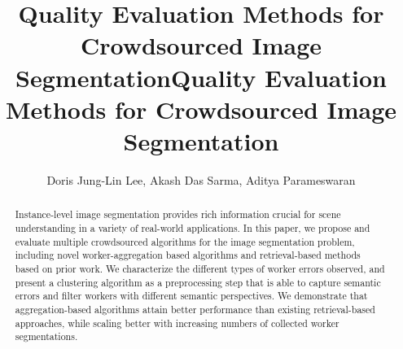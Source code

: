 \documentclass[letterpaper]{article} %
\title{Quality Evaluation Methods for Crowdsourced Image Segmentation}
\begin{document}
           \title{Quality Evaluation Methods for Crowdsourced Image Segmentation}
           \author{Doris Jung-Lin Lee, Akash Das Sarma, Aditya Parameswaran}
           \maketitle
           \begin{abstract}
           
           Instance-level image segmentation provides rich information crucial for scene understanding in a variety of real-world applications. In this paper, we propose and evaluate multiple crowdsourced algorithms for the image segmentation problem, including novel worker-aggregation based algorithms and retrieval-based methods based on prior work. We characterize the different types of worker errors observed, and present a clustering algorithm as a preprocessing step that is able to capture semantic errors and filter workers with different semantic perspectives. We demonstrate that aggregation-based algorithms attain better performance than existing retrieval-based approaches, while scaling better with increasing numbers of collected worker segmentations. 
          \end{abstract}
               
          
          
          
          
          
          
          


\end{document}
